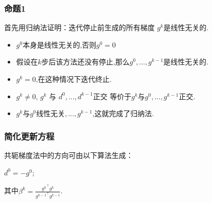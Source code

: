 \documentclass{beamer}
\begin{document}
	
	\begin{frame}
        \frametitle{命题1 }
	
         
		

		    首先用归纳法证明：迭代停止前生成的所有梯度 $g^k$是线性无关的.\\
			\begin{itemize}
				\item $g^0$本身是线性无关的,否则$g^0=0$ %
				\item 假设在$k$步后该方法还没有停止,那么$g^0,\dots,g^{k-1}$是线性无关的.
				\item $g^k=0$,在这种情况下迭代终止.
				\item  $g^k \neq 0$, $g^k$ 与 $d^0,\dots, d^{k-1}$正交 等价于$g^k$与$g^0,\dots, g^{k-1}$正交.
				\item $g^k$与$g^0线性无关,\dots, g^{k-1}$,这就完成了归纳法.
				
				
			\end{itemize}
			
		
	\end{frame}
	\begin{frame}
		\frametitle{简化更新方程}
		
		\normaltitle{命题1}
			共轭梯度法中的方向可由以下算法生成：
       
			$d^0=-g^0$;

           其中$\beta^k =  \frac{{g^k}^{\top}{g^k}}{{g^{k-1}}^{\top}{g^{k-1}}} $.
			
		
	\end{frame}
	
\end{document}

